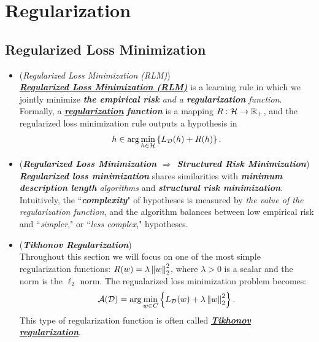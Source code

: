 \documentclass[11pt]{article}
\begin{document}
\section{Regularization}
\subsection{Regularized Loss Minimization}
\begin{itemize}
\item \begin{definition}(\emph{Regularized Loss Minimization (RLM)})\\
\underline{\textbf{\emph{Regularized Loss Minimization (RLM)}}} is a learning rule in which we jointly minimize \emph{\textbf{the empirical risk} and a \textbf{regularization} function}. Formally, a \underline{\textbf{\emph{regularization}}} \textbf{\emph{function}} is a mapping $R: {\mathcal H} \to {\mathbb R}_{+}$, and the regularized loss minimization rule outputs a hypothesis in
\begin{align}
h \in \arg\min_{h \in {\mathcal H}}\left\{ L_{{\mathcal D}}(h) + R(h)\right\}. \label{def: rlm}
\end{align} 
\end{definition}

\item \begin{remark} (\textbf{\emph{Regularized Loss Minimization $\Rightarrow$ Structured Risk Minimization}})\\
\emph{\textbf{Regularized loss minimization}} shares similarities with \emph{\textbf{minimum description length} algorithms} and \emph{\textbf{structural risk minimization}}. Intuitively, the ``\emph{\textbf{complexity}}" of hypotheses is measured by \emph{the value of the regularization function}, and the algorithm balances between low empirical risk and ``\emph{simpler}," or ``\emph{less complex}," hypotheses.
\end{remark}

\item \begin{definition}(\textbf{\emph{Tikhonov Regularization}})\\
Throughout this section we will focus on one of the most simple regularization functions: $R(w)=\lambda \left\|w\right\|_{2}^2$, where $\lambda > 0$ is a scalar and the norm is the $\ell_2$ norm. The regualarized loss minimization problem becomes:
\begin{align}
{\mathcal A}({\mathcal D}) = \arg\min_{w \in C}\left\{ L_{{\mathcal D}}(w) + \lambda \left\|w\right\|_{2}^2\right\}. \label{def: tikhonov}
\end{align}  This type of regularization function is often called \underline{\textbf{\emph{Tikhonov regularization}}}.
\end{definition}


\end{itemize}
\end{document}
